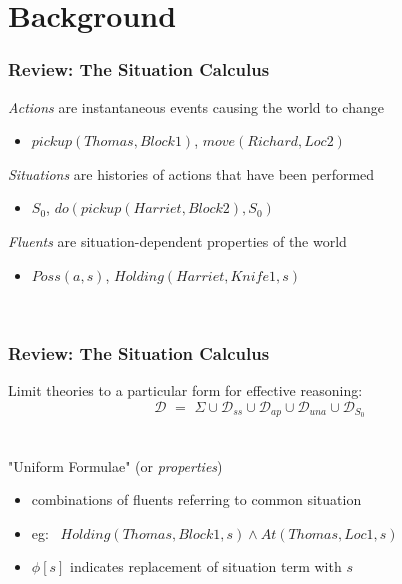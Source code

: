 \documentclass[compress]{beamer}
\begin{document}
\section{Background}

\begin{frame}
\frametitle{Review: The Situation Calculus}
\emph{Actions} are instantaneous events causing the world to change
\begin{itemize}
  \item $pickup(Thomas,Block1)$, $move(Richard,Loc2)$
\end{itemize}
\emph{Situations} are histories of actions that have been performed
\begin{itemize}
  \item $S_0$, $do(pickup(Harriet,Block2),S_0)$
\end{itemize}
\emph{Fluents} are situation-dependent properties of the world
\begin{itemize}
  \item $Poss(a,s)$, $Holding(Harriet,Knife1,s)$
\end{itemize}
\ \\
\end{frame}

\begin{frame}
\frametitle{Review: The Situation Calculus}
Limit theories to a particular form for effective reasoning:
\begin{equation*}
\mathcal{D}\,\,=\,\,\Sigma\cup\mathcal{D}_{ss}\cup\mathcal{D}_{ap}\cup\mathcal{D}_{una}\cup\mathcal{D}_{S_0}
\end{equation*}
\ \\
\ \\
"Uniform Formulae" (or \emph{properties})
\begin{itemize}
 \item combinations of fluents referring to common situation
 \item eg: $\,\,\,Holding(Thomas,Block1,s) \wedge At(Thomas,Loc1,s)$
 \item $\phi[s]$ indicates replacement of situation term with $s$
\end{itemize}

\end{frame}
\end{document}
